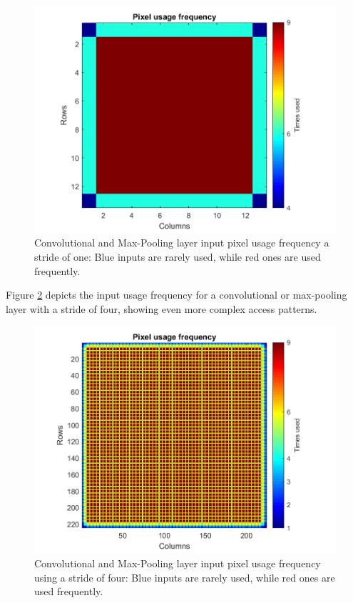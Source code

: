 \begin{figure} [H]
	\centering
	\includegraphics[width=\textwidth]{Images/Scheduling/Conv5-pixel-frequency.png}
	\decoRule
	\caption[Convolutional and Max-Pooling layer input pixel usage frequency using a stride of one]{Convolutional and Max-Pooling layer input pixel usage frequency a stride of one: Blue inputs are rarely used, while red ones are used frequently.}
	\label{fig:Conv5-pixel-frequency}
\end{figure}

Figure \ref{fig:Conv1-pixel-frequency} depicts the input usage frequency for a convolutional or max-pooling layer with a stride of four, showing even more complex access patterns.

\begin{figure} [H]
	\centering
	\includegraphics[width=\textwidth]{Images/Scheduling/Conv1-pixel-frequency.png}
	\decoRule
	\caption[Convolutional and Max-Pooling layer input pixel usage frequency using a stride of four]{Convolutional and Max-Pooling layer input pixel usage frequency using a stride of four: Blue inputs are rarely used, while red ones are used frequently.}
	\label{fig:Conv1-pixel-frequency}
\end{figure}


